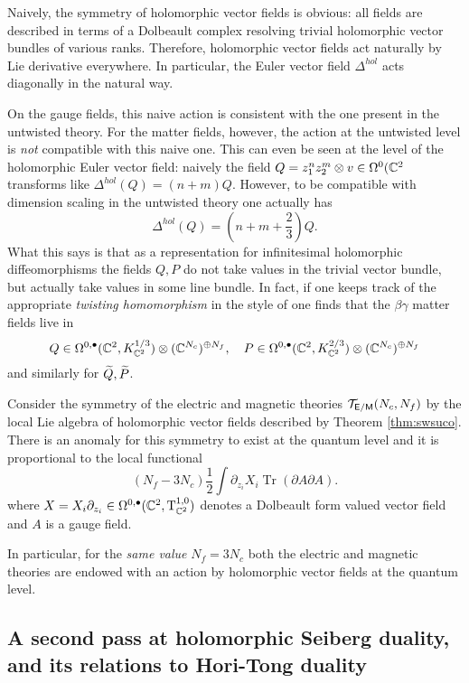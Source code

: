 \documentclass[11pt]{amsart}
\renewcommand{\op}{\operatorname}
\begin{document}
Naively, the symmetry of holomorphic vector fields is obvious: all fields are described in terms of a Dolbeault complex resolving trivial holomorphic vector bundles of various ranks. 
Therefore, holomorphic vector fields act naturally by Lie derivative everywhere. 
In particular, the Euler vector field $\Delta^{hol}$ acts diagonally in the natural way. 

On the gauge fields, this naive action is consistent with the one present in the untwisted theory. 
For the matter fields, however, the action at the untwisted level is {\em not} compatible with this naive one. 
This can even be seen at the level of the holomorphic Euler vector field: naively the field $Q = z_1^n z_2^m \otimes v \in \Omega^0 (\CC^2$ transforms like $\Delta^{hol}(Q) = (n+m) Q$.
However, to be compatible with dimension scaling in the untwisted theory one actually has 
\[
\Delta^{hol}(Q) = \left(n + m + \frac23\right) Q .
\]
What this says is that as a representation for infinitesimal holomorphic diffeomorphisms the fields $Q, P$ do not take values in the trivial vector bundle, but actually take values in some line bundle.  
In fact, if one keeps track of the appropriate {\em twisting homomorphism} in the style of \cite{WittenTwist} one finds that the $\beta\gamma$ matter fields live in
\[
Q \in \Omega^{0,\bu}(\CC^2 , K_{\CC^2}^{1/3}) \otimes (\CC^{N_c})^{\oplus N_f} , \quad P \in \Omega^{0,\bu}(\CC^2 , K_{\CC^2}^{2/3}) \otimes (\CC^{N_c})^{\oplus N_f}
\]
and similarly for $\Tilde{Q}, \Tilde{P}$. 

\begin{prop}
Consider the symmetry of the electric and magnetic theories $\cT_{\sfE / \sfM}(N_c,N_f)$ by the local Lie algebra of holomorphic vector fields described by Theorem \ref{thm:swsuco}. 
There is an anomaly for this symmetry to exist at the quantum level and it is proportional to the local functional
\[
\left(N_f - 3N_c\right) \frac12 \int \partial_{z_i} X_i \op{Tr} (\partial A \partial A)  .
\]
where $X = X_i \partial_{z_i} \in \Omega^{0,\bu}(\CC^2, \T_{\CC^2}^{1,0})$ denotes a Dolbeault form valued vector field and $A$ is a gauge field.
\end{prop}

In particular, for the {\em same value} $N_f = 3 N_c$ both the electric and magnetic theories are endowed with an action by holomorphic vector fields at the quantum level. 

\subsection{A second pass at holomorphic Seiberg duality, and its relations to Hori-Tong duality}
\end{document}
